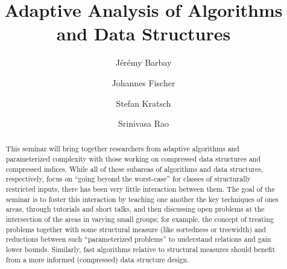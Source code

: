 \documentclass[a4paper,10pt]{article}
\begin{document}
\title{Adaptive Analysis of Algorithms and Data Structures}


\author{J\'er\'emy Barbay \and Johannes Fischer \and Stefan Kratsch \and Srinivasa Rao }

\maketitle              %

\begin{abstract}
This seminar will bring together researchers from adaptive algorithms and parameterized complexity with those working on compressed data structures and compressed indices. While all of these subareas of algorithms and data structures, respectively, focus on ``going beyond the worst-case'' for classes of structurally restricted inputs, there has been very little interaction between them. The goal of the seminar is to foster this interaction by teaching one another the key techniques of ones areas, through tutorials and short talks, and then discussing open problems at the intersection of the areas in varying small groups; for example, the concept of treating problems together with some structural measure (like sortedness or treewidth) and reductions between such ``parameterized problems'' to understand relations and gain lower bounds. Similarly, fast algorithms relative to structural measures should benefit from a more informed (compressed) data structure design.
\end{abstract}

\end{document}

